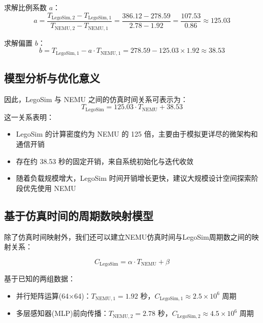 \documentclass[bachelor]{thesis-uestc}
\begin{document}
    求解比例系数 $a$：
    \begin{equation}
    a = \frac{T_{\textrm{LegoSim},2} - T_{\textrm{LegoSim},1}}
             {T_{\textrm{NEMU},2} - T_{\textrm{NEMU},1}}
      = \frac{386.12 - 278.59}{2.78 - 1.92}
      = \frac{107.53}{0.86}
      \approx 125.03
    \end{equation}
    
    求解偏置 $b$：
    \begin{equation}
    b = T_{\textrm{LegoSim},1} - a \cdot T_{\textrm{NEMU},1}
      = 278.59 - 125.03 \times 1.92
      \approx 38.53
    \end{equation}
    
    \subsection{模型分析与优化意义}
    
    因此，LegoSim 与 NEMU 之间的仿真时间关系可表示为：
    \begin{equation}
    T_{\textrm{LegoSim}} = 125.03 \cdot T_{\textrm{NEMU}} + 38.53
    \end{equation}
    这一关系表明：
    \begin{itemize}
      \item LegoSim 的计算密度约为 NEMU 的 125 倍，主要由于模拟更详尽的微架构和通信开销
      \item 存在约 38.53 秒的固定开销，来自系统初始化与迭代收敛
      \item 随着负载规模增大，LegoSim 时间开销增长更快，建议大规模设计空间探索阶段优先使用 NEMU
    \end{itemize}

    
    \subsection{基于仿真时间的周期数映射模型}
    
    除了仿真时间映射外，我们还可以建立NEMU仿真时间与LegoSim周期数之间的映射关系：
    
    \begin{equation} C_{\textrm{LegoSim}} = \alpha \cdot T_{\textrm{NEMU}} + \beta \end{equation}
    
    基于已知的两组数据： \begin{itemize} \item 并行矩阵运算(64×64)：$T_{\textrm{NEMU},1} = 1.92$ 秒，$C_{\textrm{LegoSim},1} \approx 2.5 \times 10^6$ 周期 \item 多层感知器(MLP)前向传播：$T_{\textrm{NEMU},2} = 2.78$ 秒，$C_{\textrm{LegoSim},2} \approx 4.5 \times 10^6$ 周期 \end{itemize}
    
\end{document}

